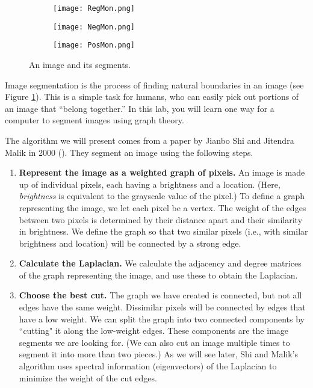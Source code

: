 \begin{figure}
    \centering
    \begin{subfigure}{0.31\textwidth}
        \texttt{[image: RegMon.png]}
    \end{subfigure}
   \hspace*{\fill}
    \begin{subfigure}{0.31\textwidth}
        \texttt{[image: NegMon.png]}
    \end{subfigure}
    \hspace*{\fill}
    \begin{subfigure}{0.31\textwidth}
        \texttt{[image: PosMon.png]}
    \end{subfigure}
    
\caption{An image and its segments.}
\label{fig:monument}
\end{figure}
Image segmentation is the process of finding natural boundaries in an image (see Figure \ref{fig:monument}).
This is a simple task for humans, who can easily pick out portions of an image that ``belong together.''
In this lab, you will learn one way for a computer to segment images using graph theory.

The algorithm we will present comes from a paper by Jianbo Shi and Jitendra Malik in 2000 (\cite{Shi2000}).
They segment an image using the following steps.
\begin{enumerate}
	\item \textbf{Represent the image as a weighted graph of pixels.} 
An image is made up of individual pixels, each having a brightness and a location.
(Here, \emph{brightness} is equivalent to the grayscale value of the pixel.)
To define a graph representing the image, we let each pixel be a vertex.
The weight of the edges between two pixels is determined by their distance apart and their similarity in brightness.
We define the graph so that two similar pixels (i.e., with similar brightness and location) will be connected by a strong edge.
	\item \textbf{Calculate the Laplacian.} 
We calculate the adjacency and degree matrices of the graph representing the image, and use these to obtain the Laplacian.
	\item \textbf{Choose the best cut.} 
The graph we have created is connected, but not all edges have the same weight.
Dissimilar pixels will be connected by edges that have a low weight.
We can split the graph into two connected components by ``cutting" it along the low-weight edges.
These components are the image segments we are looking for.
(We can also cut an image multiple times to segment it into more than two pieces.)
As we will see later, Shi and Malik's algorithm uses spectral information (eigenvectors) of the Laplacian to minimize the weight of the cut edges.
\end{enumerate}

